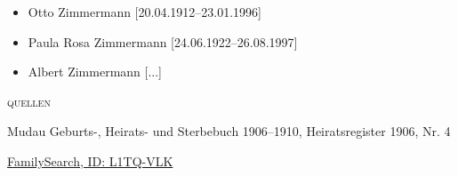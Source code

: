 \begin{person}[
    surname = {Röckel},
    givenname = {Ida},
    suffix = {1879--1955},
    label = {@I1154@},
    filename = {Ida Röckel (1879)}
    ]
\begin{itemize}
\item Otto Zimmermann [20.04.1912--23.01.1996]
\item Paula Rosa Zimmermann [24.06.1922--26.08.1997]
\item Albert Zimmermann [...]
\end{itemize}
\medbreak
\textsc{{quellen}}
\begin{enumerate}[label={[\arabic*]}]
\item Mudau Geburts-, Heirats- und Sterbebuch 1906–1910, Heiratsregister 1906, Nr. 4
\item \href{https://www.familysearch.org/tree/person/details/L1TQ-VLK}{FamilySearch, ID: L1TQ-VLK}
\end{enumerate}

\end{person}

